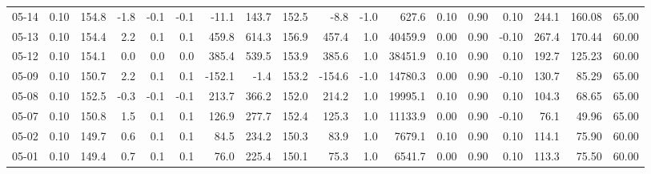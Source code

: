 \begin{threeparttable}
{\begin{tabular}{lrrrrrrrrrrrrrrrrr}
  05-14 &     0.10 & 154.8 &              -1.8 &              -0.1 &               -0.1 &              -11.1 &  143.7 & 152.5 &       -8.8 &                     -1.0 &               627.6 &       0.10 &      0.90 &           0.10 &            244.1 &          160.08 &                  65.00 \\
  05-13 &     0.10 & 154.4 &               2.2 &               0.1 &                0.1 &              459.8 &  614.3 & 156.9 &      457.4 &                      1.0 &             40459.9 &       0.00 &      0.90 &          -0.10 &            267.4 &          170.44 &                  60.00 \\
  05-12 &     0.10 & 154.1 &               0.0 &               0.0 &                0.0 &              385.4 &  539.5 & 153.9 &      385.6 &                      1.0 &             38451.9 &       0.10 &      0.90 &           0.10 &            192.7 &          125.23 &                  60.00 \\
  05-09 &     0.10 & 150.7 &               2.2 &               0.1 &                0.1 &             -152.1 &   -1.4 & 153.2 &     -154.6 &                     -1.0 &             14780.3 &       0.00 &      0.90 &          -0.10 &            130.7 &           85.29 &                  65.00 \\
  05-08 &     0.10 & 152.5 &              -0.3 &              -0.1 &               -0.1 &              213.7 &  366.2 & 152.0 &      214.2 &                      1.0 &             19995.1 &       0.10 &      0.90 &           0.10 &            104.3 &           68.65 &                  65.00 \\
  05-07 &     0.10 & 150.8 &               1.5 &               0.1 &                0.1 &              126.9 &  277.7 & 152.4 &      125.3 &                      1.0 &             11133.9 &       0.00 &      0.90 &          -0.10 &             76.1 &           49.96 &                  65.00 \\
  05-02 &     0.10 & 149.7 &               0.6 &               0.1 &                0.1 &               84.5 &  234.2 & 150.3 &       83.9 &                      1.0 &              7679.1 &       0.10 &      0.90 &           0.10 &            114.1 &           75.90 &                  60.00 \\
  05-01 &     0.10 & 149.4 &               0.7 &               0.1 &                0.1 &               76.0 &  225.4 & 150.1 &       75.3 &                      1.0 &              6541.7 &       0.00 &      0.90 &           0.10 &            113.3 &           75.50 &                  60.00 \\

\end{tabular}}
\end{threeparttable}
